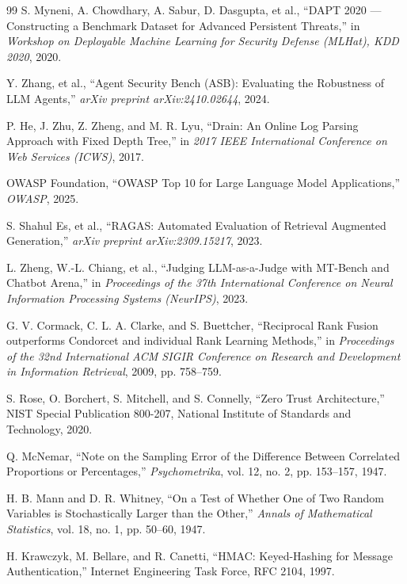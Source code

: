 \documentclass[12pt,a4paper]{article}
\begin{document}
\begin{thebibliography}{99}
    S. Myneni, A. Chowdhary, A. Sabur, D. Dasgupta, et al., ``DAPT 2020 --- Constructing a Benchmark Dataset for Advanced Persistent Threats,'' in \emph{Workshop on Deployable Machine Learning for Security Defense (MLHat), KDD 2020}, 2020.

    Y. Zhang, et al., ``Agent Security Bench (ASB): Evaluating the Robustness of LLM Agents,'' \emph{arXiv preprint arXiv:2410.02644}, 2024.

    P. He, J. Zhu, Z. Zheng, and M. R. Lyu, ``Drain: An Online Log Parsing Approach with Fixed Depth Tree,'' in \emph{2017 IEEE International Conference on Web Services (ICWS)}, 2017.

    OWASP Foundation, ``OWASP Top 10 for Large Language Model Applications,'' \emph{OWASP}, 2025.

    S. Shahul Es, et al., ``RAGAS: Automated Evaluation of Retrieval Augmented Generation,'' \emph{arXiv preprint arXiv:2309.15217}, 2023.

    L. Zheng, W.-L. Chiang, et al., ``Judging LLM-as-a-Judge with MT-Bench and Chatbot Arena,'' in \emph{Proceedings of the 37th International Conference on Neural Information Processing Systems (NeurIPS)}, 2023.

    G. V. Cormack, C. L. A. Clarke, and S. Buettcher, ``Reciprocal Rank Fusion outperforms Condorcet and individual Rank Learning Methods,'' in \emph{Proceedings of the 32nd International ACM SIGIR Conference on Research and Development in Information Retrieval}, 2009, pp. 758--759.

    S. Rose, O. Borchert, S. Mitchell, and S. Connelly, ``Zero Trust Architecture,'' NIST Special Publication 800-207, National Institute of Standards and Technology, 2020.

    Q. McNemar, ``Note on the Sampling Error of the Difference Between Correlated Proportions or Percentages,'' \emph{Psychometrika}, vol. 12, no. 2, pp. 153--157, 1947.

    H. B. Mann and D. R. Whitney, ``On a Test of Whether One of Two Random Variables is Stochastically Larger than the Other,'' \emph{Annals of Mathematical Statistics}, vol. 18, no. 1, pp. 50--60, 1947.

    H. Krawczyk, M. Bellare, and R. Canetti, ``HMAC: Keyed-Hashing for Message Authentication,'' Internet Engineering Task Force, RFC 2104, 1997.

\end{thebibliography}
\end{document}
